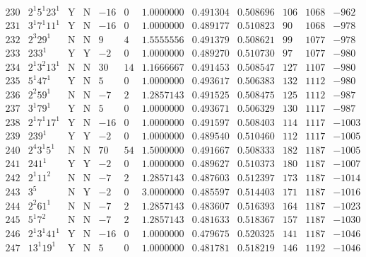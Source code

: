 \documentclass[11pt,reqno,a4letter]{article}
\numberwithin{figure}{section}
\numberwithin{table}{section}
\theoremstyle{plain}
\numberwithin{theorem}{section}
\theoremstyle{definition}
\begin{document}
\begin{table}[ht]
\begin{equation*}
{\begin{array}{cc|cc|ccc|cc|ccc}
 230 & 2^1 5^1 23^1 & \text{Y} & \text{N} & -16 & 0 & 1.0000000 & 0.491304 & 0.508696 & 106 & 1068 & -962 \\
 231 & 3^1 7^1 11^1 & \text{Y} & \text{N} & -16 & 0 & 1.0000000 & 0.489177 & 0.510823 & 90 & 1068 & -978 \\
 232 & 2^3 29^1 & \text{N} & \text{N} & 9 & 4 & 1.5555556 & 0.491379 & 0.508621 & 99 & 1077 & -978 \\
 233 & 233^1 & \text{Y} & \text{Y} & -2 & 0 & 1.0000000 & 0.489270 & 0.510730 & 97 & 1077 & -980 \\
 234 & 2^1 3^2 13^1 & \text{N} & \text{N} & 30 & 14 & 1.1666667 & 0.491453 & 0.508547 & 127 & 1107 & -980 \\
 235 & 5^1 47^1 & \text{Y} & \text{N} & 5 & 0 & 1.0000000 & 0.493617 & 0.506383 & 132 & 1112 & -980 \\
 236 & 2^2 59^1 & \text{N} & \text{N} & -7 & 2 & 1.2857143 & 0.491525 & 0.508475 & 125 & 1112 & -987 \\
 237 & 3^1 79^1 & \text{Y} & \text{N} & 5 & 0 & 1.0000000 & 0.493671 & 0.506329 & 130 & 1117 & -987 \\
 238 & 2^1 7^1 17^1 & \text{Y} & \text{N} & -16 & 0 & 1.0000000 & 0.491597 & 0.508403 & 114 & 1117 & -1003 \\
 239 & 239^1 & \text{Y} & \text{Y} & -2 & 0 & 1.0000000 & 0.489540 & 0.510460 & 112 & 1117 & -1005 \\
 240 & 2^4 3^1 5^1 & \text{N} & \text{N} & 70 & 54 & 1.5000000 & 0.491667 & 0.508333 & 182 & 1187 & -1005 \\
 241 & 241^1 & \text{Y} & \text{Y} & -2 & 0 & 1.0000000 & 0.489627 & 0.510373 & 180 & 1187 & -1007 \\
 242 & 2^1 11^2 & \text{N} & \text{N} & -7 & 2 & 1.2857143 & 0.487603 & 0.512397 & 173 & 1187 & -1014 \\
 243 & 3^5 & \text{N} & \text{Y} & -2 & 0 & 3.0000000 & 0.485597 & 0.514403 & 171 & 1187 & -1016 \\
 244 & 2^2 61^1 & \text{N} & \text{N} & -7 & 2 & 1.2857143 & 0.483607 & 0.516393 & 164 & 1187 & -1023 \\
 245 & 5^1 7^2 & \text{N} & \text{N} & -7 & 2 & 1.2857143 & 0.481633 & 0.518367 & 157 & 1187 & -1030 \\
 246 & 2^1 3^1 41^1 & \text{Y} & \text{N} & -16 & 0 & 1.0000000 & 0.479675 & 0.520325 & 141 & 1187 & -1046 \\
 247 & 13^1 19^1 & \text{Y} & \text{N} & 5 & 0 & 1.0000000 & 0.481781 & 0.518219 & 146 & 1192 & -1046 \\

\end{array}}
\end{equation*}
\end{table}
\end{document}
